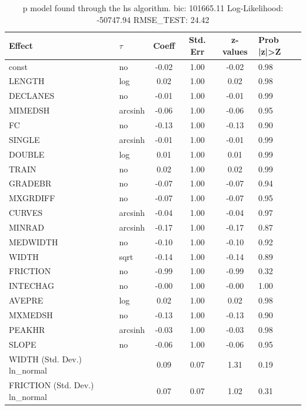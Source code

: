 \begin{table}
	\caption{p model found through the hs algorithm. bic: 101665.11 Log-Likelihood: -50747.94 RMSE_TEST: 24.42}
	\begin{center}
		\begin{tabular}{|l|l|c|c|c|l|}
			\hline
			Effect & $\tau$ & Coeff & Std. Err & z-values & Prob |z|>Z \\
			\hline
			const & no & -0.02 & 1.00 & -0.02 & 0.98 \\
			\hline
			LENGTH & log & 0.02 & 1.00 & 0.02 & 0.98 \\
			\hline
			DECLANES & no & -0.01 & 1.00 & -0.01 & 0.99 \\
			\hline
			MIMEDSH & arcsinh & -0.06 & 1.00 & -0.06 & 0.95 \\
			\hline
			FC & no & -0.13 & 1.00 & -0.13 & 0.90 \\
			\hline
			SINGLE & arcsinh & -0.01 & 1.00 & -0.01 & 0.99 \\
			\hline
			DOUBLE & log & 0.01 & 1.00 & 0.01 & 0.99 \\
			\hline
			TRAIN & no & 0.02 & 1.00 & 0.02 & 0.99 \\
			\hline
			GRADEBR & no & -0.07 & 1.00 & -0.07 & 0.94 \\
			\hline
			MXGRDIFF & no & -0.07 & 1.00 & -0.07 & 0.95 \\
			\hline
			CURVES & arcsinh & -0.04 & 1.00 & -0.04 & 0.97 \\
			\hline
			MINRAD & arcsinh & -0.17 & 1.00 & -0.17 & 0.87 \\
			\hline
			MEDWIDTH & no & -0.10 & 1.00 & -0.10 & 0.92 \\
			\hline
			WIDTH & sqrt & -0.14 & 1.00 & -0.14 & 0.89 \\
			\hline
			FRICTION & no & -0.99 & 1.00 & -0.99 & 0.32 \\
			\hline
			INTECHAG & no & -0.00 & 1.00 & -0.00 & 1.00 \\
			\hline
			AVEPRE & log & 0.02 & 1.00 & 0.02 & 0.98 \\
			\hline
			MXMEDSH & no & -0.13 & 1.00 & -0.13 & 0.90 \\
			\hline
			PEAKHR & arcsinh & -0.03 & 1.00 & -0.03 & 0.98 \\
			\hline
			SLOPE & no & -0.06 & 1.00 & -0.06 & 0.95 \\
			\hline
			WIDTH (Std. Dev.) ln_normal &  & 0.09 & 0.07 & 1.31 & 0.19 \\
			\hline
			FRICTION (Std. Dev.) ln_normal &  & 0.07 & 0.07 & 1.02 & 0.31 \\

\end{tabular}
\end{center}
\end{table}
